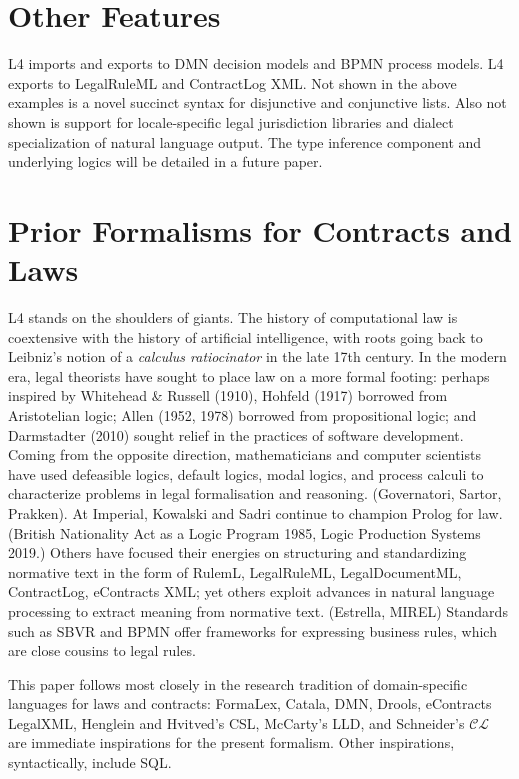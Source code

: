\documentclass{IOS-Book-Article}
\begin{document}
\section{Other Features}

L4 imports and exports to DMN decision models and BPMN process models. L4 exports to LegalRuleML and ContractLog XML. Not shown in the above examples is a novel succinct syntax for disjunctive and conjunctive lists. Also not shown is support for locale-specific legal jurisdiction libraries and dialect specialization of natural language output. The type inference component and underlying logics will be detailed in a future paper.

\section{Prior Formalisms for Contracts and Laws}

L4 stands on the shoulders of giants. The history of computational law is coextensive with the history of artificial intelligence, with roots going back to Leibniz's notion of a \textit{calculus ratiocinator} in the late 17th century. In the modern era, legal theorists have sought to place law on a more formal footing: perhaps inspired by Whitehead \& Russell (1910), Hohfeld (1917) borrowed from Aristotelian logic; Allen (1952, 1978) borrowed from propositional logic; and Darmstadter (2010) sought relief in the practices of software development. Coming from the opposite direction, mathematicians and computer scientists have used defeasible logics, default logics, modal logics, and process calculi to characterize problems in legal formalisation and reasoning. (Governatori, Sartor, Prakken). At Imperial, Kowalski and Sadri continue to champion Prolog for law. (British Nationality Act as a Logic Program 1985, Logic Production Systems 2019.) Others have focused their energies on structuring and standardizing normative text in the form of RulemL, LegalRuleML, LegalDocumentML, ContractLog, eContracts XML; yet others exploit advances in natural language processing to extract meaning from normative text. (Estrella, MIREL) Standards such as SBVR and BPMN offer frameworks for expressing business rules, which are close cousins to legal rules.

This paper follows most closely in the research tradition of domain-specific languages for laws and contracts: FormaLex, Catala, DMN, Drools, eContracts LegalXML, Henglein and Hvitved's CSL, McCarty's LLD, and Schneider's $\mathcal{CL}$ are immediate inspirations for the present formalism. Other inspirations, syntactically, include SQL.
\end{document}

